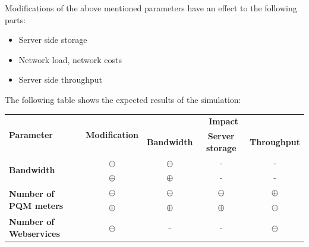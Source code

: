 Modifications of the above mentioned parameters have an effect to the following parts:

\begin{itemize}
	\item Server side storage
	\item Network load, network costs
	\item Server side throughput
\end{itemize}

The following table shows the expected results of the simulation:

\begin{table}[h]
\centering
\begin{tabular}{l|c|c|c|c}
\hline
\multicolumn{1}{l|}{\multirow{2}{*}{\textbf{Parameter}}} & \multicolumn{1}{c|}{\multirow{2}{*}{\textbf{Modification}}} & \multicolumn{3}{c}{\textbf{Impact}}                                                                                                  \\ \cline{3-5} 
\multicolumn{1}{c|}{} & \multicolumn{1}{c|}{}  & \multicolumn{1}{c|}{\textbf{Bandwidth}} & \multicolumn{1}{c|}{\textbf{Server storage}} & \multicolumn{1}{c}{\textbf{Throughput}} \\ \hline \hline
\multirow{2}{*}{\textbf{Bandwidth}} & $\ominus$ & $\ominus$ & - & - \\
\cline{2-5} 
                                                         & $\oplus$                                                           & $\oplus$                                       & -                                                 & -                                       \\ \hline
\multirow{2}{*}{\textbf{Number of PQM meters}}           & $\ominus$                                                           & $\ominus$                                       & $\ominus$                                                 & $\oplus$                                       \\ \cline{2-5} 
                                                         & $\oplus$                                                           & $\oplus$                                       & $\oplus$                                                 & $\ominus$                                       \\ \hline
\multirow{2}{*}{\textbf{Number of Webservices}}          & $\ominus$                                                           & -                                       & -                                                 & $\ominus$                                       \\ \cline{2-5} 

\end{tabular}
\end{table}
